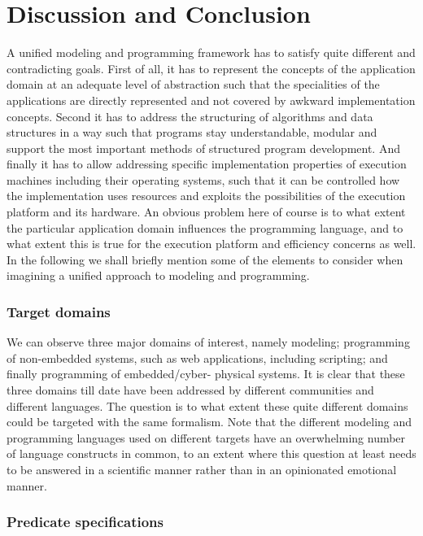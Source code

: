 
\section{Discussion and Conclusion}
\label{sec:conclusion}


\label{sec:concerns}

A unified modeling and programming framework has to satisfy 
quite different and contradicting goals.
First of all, it has to represent the concepts of the 
application domain at an adequate level of 
abstraction such that the specialities of the applications 
are directly represented and not covered by awkward implementation 
concepts.  
Second it has to address the structuring of algorithms and data 
structures in a way such that programs stay understandable, 
modular and support the most important methods of structured 
program development. And finally it has to allow addressing 
specific implementation properties of execution machines including 
their operating systems, such that it can be controlled how the 
implementation uses resources and exploits the possibilities of 
the execution platform and its hardware. An obvious problem here 
of course is to what extent the particular application domain 
influences the programming language, and to what extent this 
is true for the execution platform and efficiency concerns as
well. In the following we shall briefly mention some of the
elements to consider when imagining a unified approach to
modeling and programming.


\subsubsection{Target domains}

We can observe three major domains of interest, namely modeling; 
programming of non-embedded systems, such as web applications, 
including scripting; and finally programming of embedded/cyber-
physical systems. It is clear that these three domains till date 
have been addressed by different communities and different 
languages. The question is to what extent these
quite different domains could be targeted with the same formalism.
Note that the different modeling and programming languages used on
different targets have an overwhelming number of language constructs in
common, to an extent where this question at least needs to be answered
in a scientific manner rather than in an opinionated emotional manner.

\subsubsection{Predicate specifications}

